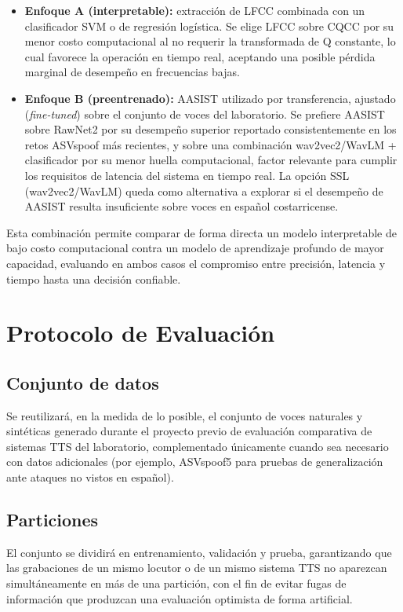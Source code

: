 \documentclass[conference]{IEEEtran}
\begin{document}
\begin{itemize}
\item \textbf{Enfoque A (interpretable):} extracción de LFCC combinada con un clasificador SVM o de regresión logística. Se elige LFCC sobre CQCC por su menor costo computacional al no requerir la transformada de Q constante, lo cual favorece la operación en tiempo real, aceptando una posible pérdida marginal de desempeño en frecuencias bajas.
\item \textbf{Enfoque B (preentrenado):} AASIST utilizado por transferencia, ajustado (\emph{fine-tuned}) sobre el conjunto de voces del laboratorio. Se prefiere AASIST sobre RawNet2 por su desempeño superior reportado consistentemente en los retos ASVspoof más recientes, y sobre una combinación wav2vec2/WavLM + clasificador por su menor huella computacional, factor relevante para cumplir los requisitos de latencia del sistema en tiempo real. La opción SSL (wav2vec2/WavLM) queda como alternativa a explorar si el desempeño de AASIST resulta insuficiente sobre voces en español costarricense.
\end{itemize}

Esta combinación permite comparar de forma directa un modelo interpretable de bajo costo computacional contra un modelo de aprendizaje profundo de mayor capacidad, evaluando en ambos casos el compromiso entre precisión, latencia y tiempo hasta una decisión confiable.

\section{Protocolo de Evaluación}

\subsection{Conjunto de datos}

Se reutilizará, en la medida de lo posible, el conjunto de voces naturales y sintéticas generado durante el proyecto previo de evaluación comparativa de sistemas TTS del laboratorio, complementado únicamente cuando sea necesario con datos adicionales (por ejemplo, ASVspoof5 para pruebas de generalización ante ataques no vistos en español).

\subsection{Particiones}

El conjunto se dividirá en entrenamiento, validación y prueba, garantizando que las grabaciones de un mismo locutor o de un mismo sistema TTS no aparezcan simultáneamente en más de una partición, con el fin de evitar fugas de información que produzcan una evaluación optimista de forma artificial.
\end{document}
